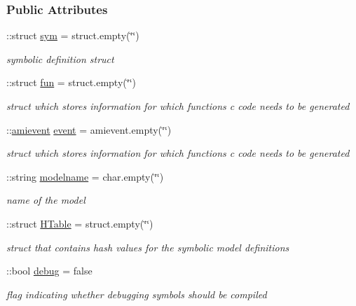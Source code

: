 \subsubsection*{Public Attributes}
\begin{DoxyCompactItemize}
\item 
\+::struct \hyperlink{classamimodel_a3c48fff3d28406486a4f1b5e18da7ca6}{sym} = struct.\+empty(\char`\"{}\char`\"{})
\begin{DoxyCompactList}\small\item\em symbolic definition struct \end{DoxyCompactList}\item 
\+::struct \hyperlink{classamimodel_a743fa290dbc0a67a3843d5ab0426e9b4}{fun} = struct.\+empty(\char`\"{}\char`\"{})
\begin{DoxyCompactList}\small\item\em struct which stores information for which functions c code needs to be generated \end{DoxyCompactList}\item 
\+::\hyperlink{classamievent}{amievent} \hyperlink{classamimodel_a3b65133bb9997cd1ccf311af0927fc9e}{event} = amievent.\+empty(\char`\"{}\char`\"{})
\begin{DoxyCompactList}\small\item\em struct which stores information for which functions c code needs to be generated \end{DoxyCompactList}\item 
\+::string \hyperlink{classamimodel_a71bca9c21a6de42d8079ade31cb61044}{modelname} = char.\+empty(\char`\"{}\char`\"{})
\begin{DoxyCompactList}\small\item\em name of the model \end{DoxyCompactList}\item 
\+::struct \hyperlink{classamimodel_aafe6335df413dd688a2f44efba012cf1}{H\+Table} = struct.\+empty(\char`\"{}\char`\"{})
\begin{DoxyCompactList}\small\item\em struct that contains hash values for the symbolic model definitions \end{DoxyCompactList}\item 
\+::bool \hyperlink{classamimodel_a0514aabed091ee5e2f35766eb01eced6}{debug} = false
\begin{DoxyCompactList}\small\item\em flag indicating whether debugging symbols should be compiled \end{DoxyCompactList}\item 

\end{DoxyCompactItemize}

